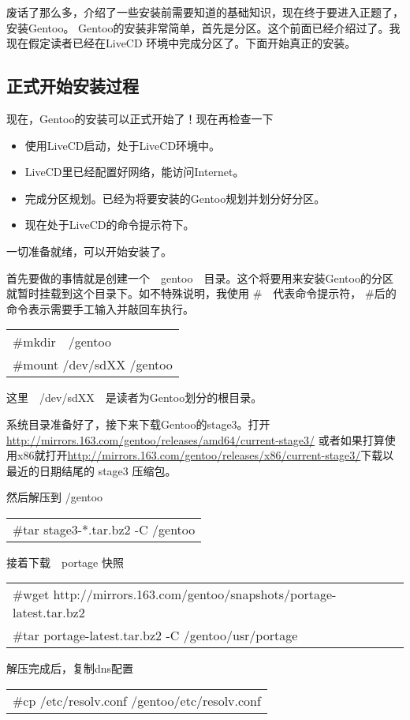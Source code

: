 \documentclass[amstex,twoside]{ctexbook}
\newenvironment{code}{\small\tt\begin{longtable}{p{0.8\textwidth}}}{\end{longtable}}
\begin{document}
废话了那么多，介绍了一些安装前需要知道的基础知识，现在终于要进入正题了，安装Gentoo。
Gentoo的安装非常简单，首先是分区。这个前面已经介绍过了。我现在假定读者已经在LiveCD 环境中完成分区了。下面开始真正的安装。


\subsection{正式开始安装过程}

现在，Gentoo的安装可以正式开始了！现在再检查一下

\begin{itemize}
\item	使用LiveCD启动，处于LiveCD环境中。
\item	LiveCD里已经配置好网络，能访问Internet。
\item	完成分区规划。已经为将要安装的Gentoo规划并划分好分区。
\item	现在处于LiveCD的命令提示符下。
\end{itemize}

一切准备就绪，可以开始安装了。

首先要做的事情就是创建一个　gentoo　目录。这个将要用来安装Gentoo的分区就暂时挂载到这个目录下。如不特殊说明，我使用 \#　代表命令提示符， \#后的命令表示需要手工输入并敲回车执行。

\begin{code}
\#mkdir　/gentoo\\
\#mount /dev/sdXX /gentoo
\end{code}

这里　/dev/sdXX　是读者为Gentoo划分的根目录。

系统目录准备好了，接下来下载Gentoo的stage3。打开　\url{http://mirrors.163.com/gentoo/releases/amd64/current-stage3/} 或者如果打算使用x86就打开\url{http://mirrors.163.com/gentoo/releases/x86/current-stage3/}下载以最近的日期结尾的 stage3 压缩包。

然后解压到 /gentoo
\begin{code}
\#tar stage3-*.tar.bz2 -C /gentoo 
\end{code}

接着下载　portage 快照
\begin{code}
\#wget http://mirrors.163.com/gentoo/snapshots/portage-latest.tar.bz2\\
\#tar portage-latest.tar.bz2 -C /gentoo/usr/portage
\end{code}

解压完成后，复制dns配置　
\begin{code}
\#cp /etc/resolv.conf /gentoo/etc/resolv.conf
\end{code}
\end{document}
